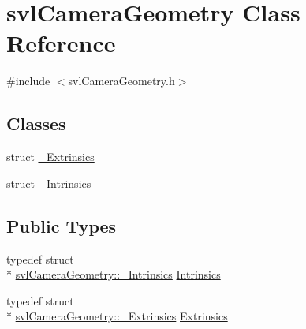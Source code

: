 \hypertarget{classsvl_camera_geometry}{\section{svl\-Camera\-Geometry Class Reference}
\label{classsvl_camera_geometry}
}


{\ttfamily \#include $<$svl\-Camera\-Geometry.\-h$>$}

\subsection*{Classes}
\begin{DoxyCompactItemize}
\item 
struct \hyperlink{structsvl_camera_geometry_1_1___extrinsics}{\-\_\-\-Extrinsics}
\item 
struct \hyperlink{structsvl_camera_geometry_1_1___intrinsics}{\-\_\-\-Intrinsics}
\end{DoxyCompactItemize}
\subsection*{Public Types}
\begin{DoxyCompactItemize}
\item 
typedef struct \\*
\hyperlink{structsvl_camera_geometry_1_1___intrinsics}{svl\-Camera\-Geometry\-::\-\_\-\-Intrinsics} \hyperlink{classsvl_camera_geometry_a864f6359614466009baca0666e6bc08e}{Intrinsics}
\item 
typedef struct \\*
\hyperlink{structsvl_camera_geometry_1_1___extrinsics}{svl\-Camera\-Geometry\-::\-\_\-\-Extrinsics} \hyperlink{classsvl_camera_geometry_a6954baa4bd0cc3577af09e13b1c18545}{Extrinsics}
\end{DoxyCompactItemize}
